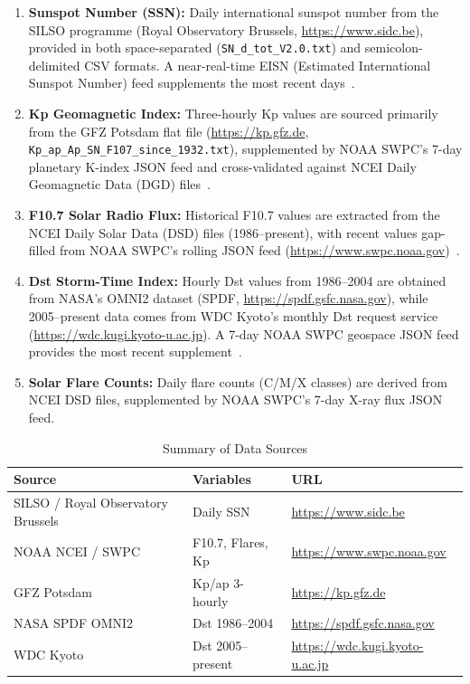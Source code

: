 \begin{enumerate}
    \item \textbf{Sunspot Number (SSN):} Daily international sunspot number from the SILSO programme (Royal Observatory Brussels, \url{https://www.sidc.be}), provided in both space-separated (\texttt{SN\_d\_tot\_V2.0.txt}) and semicolon-delimited CSV formats. A near-real-time EISN (Estimated International Sunspot Number) feed supplements the most recent days~\citep{clette_sunspot_2014}.
    \item \textbf{Kp Geomagnetic Index:} Three-hourly Kp values are sourced primarily from the GFZ Potsdam flat file (\url{https://kp.gfz.de}, \texttt{Kp\_ap\_Ap\_SN\_F107\_since\_1932.txt}), supplemented by NOAA SWPC's 7-day planetary K-index JSON feed and cross-validated against NCEI Daily Geomagnetic Data (DGD) files~\citep{bartels_kp_1939}.
    \item \textbf{F10.7 Solar Radio Flux:} Historical F10.7 values are extracted from the NCEI Daily Solar Data (DSD) files (1986--present), with recent values gap-filled from NOAA SWPC's rolling JSON feed (\url{https://www.swpc.noaa.gov})~\citep{tapping_f107_2013}.
    \item \textbf{Dst Storm-Time Index:} Hourly Dst values from 1986--2004 are obtained from NASA's OMNI2 dataset (SPDF, \url{https://spdf.gsfc.nasa.gov}), while 2005--present data comes from WDC Kyoto's monthly Dst request service (\url{https://wdc.kugi.kyoto-u.ac.jp}). A 7-day NOAA SWPC geospace JSON feed provides the most recent supplement~\citep{sugiura_dst_1964}.
    \item \textbf{Solar Flare Counts:} Daily flare counts (C/M/X classes) are derived from NCEI DSD files, supplemented by NOAA SWPC's 7-day X-ray flux JSON feed.
\end{enumerate}

\begin{table}[h]
    \centering
    \caption{Summary of Data Sources}
    \begin{tabular}{p{} p{} p{}}
        \hline
        \textbf{Source} & \textbf{Variables} & \textbf{URL} \\
        \hline
        SILSO / Royal Observatory Brussels & Daily SSN & \url{https://www.sidc.be} \\
        NOAA NCEI / SWPC & F10.7, Flares, Kp & \url{https://www.swpc.noaa.gov} \\
        GFZ Potsdam & Kp/ap 3-hourly & \url{https://kp.gfz.de} \\
        NASA SPDF OMNI2 & Dst 1986--2004 & \url{https://spdf.gsfc.nasa.gov} \\
        WDC Kyoto & Dst 2005--present & \url{https://wdc.kugi.kyoto-u.ac.jp} \\
        \hline
    \end{tabular}
    \label{tab:data_sources}
\end{table}

